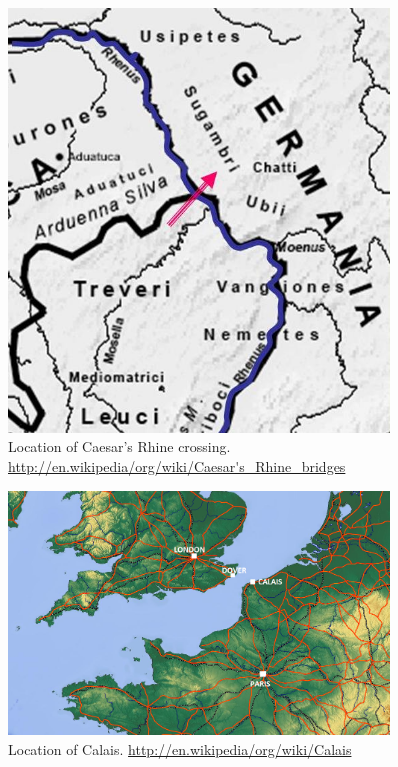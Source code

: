 \documentclass{book}
\begin{document}
\begin{figure}
   \begin{center}
      \includegraphics[width=0.9\textwidth]{images/Rhine-Crossing.jpg}
      \caption{%
         Location of Caesar's Rhine crossing\@.
         \url{http://en.wikipedia/org/wiki/Caesar's_Rhine_bridges}
      }\label{fig:Rhine-Crossing}
   \end{center}
\end{figure}

\begin{figure}
   \begin{center}
      \includegraphics[width=0.9\textwidth]{images/LondonCalaisParis.png}
      \caption{%
         Location of Calais\@.
         \url{http://en.wikipedia/org/wiki/Calais}
      }\label{fig:LondonCalaisParis}
   \end{center}
\end{figure}

\backmatter%
\end{document}
